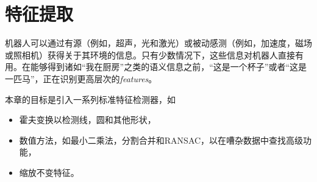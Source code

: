 \chapter{特征提取}
\label{chap:feature_extraction}



机器人可以通过有源（例如，超声，光和激光）或被动感测（例如，加速度，磁场或照相机）获得关于其环境的信息。只有少数情况下，这些信息对机器人直接有用。在能够得到诸如“我在厨房”之类的语义信息之前，“这是一个杯子”或者“这是一匹马”，正在识别更高层次的\emph{features}。

本章的目标是引入一系列标准特征检测器，如


\begin{itemize}

\item 霍夫变换以检测线，圆和其他形状，
\item 数值方法，如最小二乘法，分割合并和RANSAC，以在嘈杂数据中查找高级功能，
\item 缩放不变特征。
\end{itemize}

